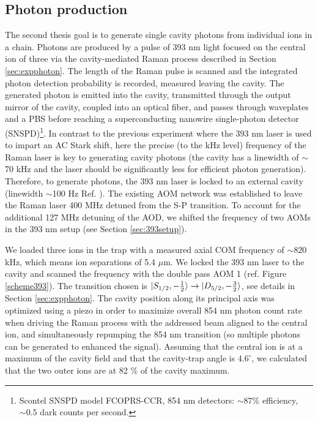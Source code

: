 \subsection{Photon production}
\label{exp:photons}
The second thesis goal is to generate single cavity photons from individual ions in a chain. Photons are produced by a pulse of 393 nm light focused on the central ion of three via the cavity-mediated Raman process described in Section \ref{sec:expphoton}. The length of the Raman pulse is scanned and the integrated photon detection probability is recorded, measured leaving the cavity. The generated photon is emitted into the cavity, transmitted through the output mirror of the cavity, coupled into an optical fiber, and passes through waveplates and a PBS before reaching a superconducting nanowire single-photon detector (SNSPD)\footnote{Scontel SNSPD model FCOPRS-CCR, 854 nm detectors: $\sim 87$\% efficiency, $\sim 0.5$ dark counts per second.}. In contrast to the previous experiment where the 393 nm laser is used to impart an AC Stark shift, here the precise (to the kHz level) frequency of the Raman laser is key to generating cavity photons (the cavity has a linewidth of $\sim$70 kHz and the laser should be significantly less for efficient photon generation). Therefore, to generate photons, the 393 nm laser is locked to an external cavity (linewidth $\sim$100 Hz Ref. \cite{helene}). The existing AOM network was established to leave the Raman laser 400 MHz detuned from the S-P transition. To account for the additional 127 MHz detuning of the AOD, we shifted the frequency of two AOMs in the 393 nm setup (see Section \ref{sec:393setup}).\par
We loaded three ions in the trap with a measured axial COM frequency of $\sim 820$ kHz, which means ion separations of 5.4 $\mu$m. We locked the 393 nm laser to the cavity and scanned the frequency with the double pass AOM 1 (ref. Figure \ref{scheme393}). The transition chosen is $\ket{S_{1/2},-\frac{1}{2}}\to \ket{D_{5/2},-\frac{3}{2}}$, see details in Section \ref{sec:expphoton}. The cavity position along its principal axis was optimized using a piezo in order to maximize overall 854 nm photon count rate when driving the Raman process with the addressed beam aligned to the central ion, and simultaneously repumping the 854 nm transition (so multiple photons can be generated to enhanced the signal). Assuming that the central ion is at a maximum of the cavity field and that the cavity-trap angle is $4.6^\circ$, we calculated that the two outer ions are at 82 \% of the cavity maximum.
